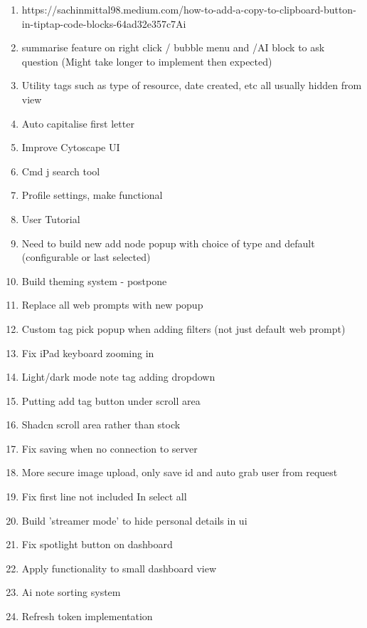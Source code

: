 \begin{enumerate}
    \item https://sachinmittal98.medium.com/how-to-add-a-copy-to-clipboard-button-in-tiptap-code-blocks-64ad32e357c7Ai 
    \item summarise feature on right click / bubble menu and /AI block to ask question  (Might take longer to implement then expected)
    \item Utility tags such as type of resource, date created,  etc all usually hidden from view 
    \item Auto capitalise first letter 
    \item Improve Cytoscape UI 
    \item Cmd j search tool 
    \item Profile settings, make functional 
    \item User Tutorial 
    \item Need to build new add node popup with choice of type and default (configurable or last selected) 
    \item Build theming system - postpone 
    \item Replace all web prompts  with new popup 
    \item Custom tag pick popup when adding filters (not just default web prompt) 
    \item Fix iPad keyboard zooming in 
    \item Light/dark mode note tag adding dropdown 
    \item Putting add tag button under scroll area 
    \item Shadcn scroll area rather than stock 
    \item Fix saving when no connection to server 
    \item More secure image upload, only save id and auto grab user from request 
    \item Fix first line not included In select all 
    \item Build 'streamer mode' to hide personal details in ui 
    \item Fix spotlight button on dashboard 
    \item Apply functionality to small dashboard view 
    \item Ai note sorting system 
    \item Refresh token implementation 

\end{enumerate}
